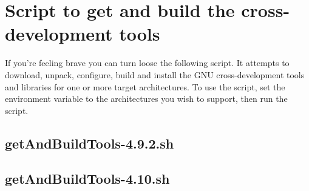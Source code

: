\documentclass{report}
\begin{document}
\appendix
\chapter{Script to get and build the cross-development tools}
\label{getAndBuildTools}
If you're feeling brave you can turn loose the following script.  It attempts
to download, unpack, configure, build and install the GNU cross-development
tools and libraries for one or more target architectures.  To use
the script, set the \verb@ARCHS@ 
environment variable to the architectures you wish to support, then run
the script.
\section{getAndBuildTools-4.9.2.sh}
\section{getAndBuildTools-4.10.sh}
\end{document}
